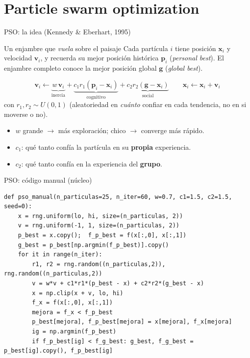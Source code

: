 \documentclass[aspectratio=169,10pt]{beamer}
\newcommand{\x}{\mathbf{x}}
\begin{document}
\section{Particle swarm optimization}

\begin{frame}{PSO: la idea (Kennedy \& Eberhart, 1995)}
  \begin{block}{Un enjambre que \emph{vuela} sobre el paisaje}
    Cada partícula $i$ tiene posición $\x_i$ y velocidad $\mathbf v_i$, y
    recuerda su mejor posición histórica $\mathbf p_i$
    (\emph{personal best}). El enjambre completo conoce la mejor
    posición global $\mathbf g$ (\emph{global best}).
  \end{block}
  \[
    \mathbf v_i \leftarrow \underbrace{w\,\mathbf v_i}_{\text{inercia}}
      + \underbrace{c_1 r_1(\mathbf p_i - \x_i)}_{\text{cognitivo}}
      + \underbrace{c_2 r_2(\mathbf g - \x_i)}_{\text{social}}
    \qquad
    \x_i \leftarrow \x_i + \mathbf v_i
  \]
  con $r_1,r_2\sim U(0,1)$ (aleatoriedad en \emph{cuánto} confiar en cada
  tendencia, no en si moverse o no).
  \begin{itemize}
    \item $w$ grande $\to$ más exploración; chico $\to$ converge más
      rápido.
    \item $c_1$: qué tanto confía la partícula en su \textbf{propia}
      experiencia.
    \item $c_2$: qué tanto confía en la experiencia del \textbf{grupo}.
  \end{itemize}
\end{frame}

\begin{frame}[fragile]{PSO: código manual (núcleo)}
\begin{lstlisting}
def pso_manual(n_particulas=25, n_iter=60, w=0.7, c1=1.5, c2=1.5, seed=0):
    x = rng.uniform(lo, hi, size=(n_particulas, 2))
    v = rng.uniform(-1, 1, size=(n_particulas, 2))
    p_best = x.copy();  f_p_best = f(x[:,0], x[:,1])
    g_best = p_best[np.argmin(f_p_best)].copy()
    for it in range(n_iter):
        r1, r2 = rng.random((n_particulas,2)), rng.random((n_particulas,2))
        v = w*v + c1*r1*(p_best - x) + c2*r2*(g_best - x)
        x = np.clip(x + v, lo, hi)
        f_x = f(x[:,0], x[:,1])
        mejora = f_x < f_p_best
        p_best[mejora], f_p_best[mejora] = x[mejora], f_x[mejora]
        ig = np.argmin(f_p_best)
        if f_p_best[ig] < f_g_best: g_best, f_g_best = p_best[ig].copy(), f_p_best[ig]
\end{lstlisting}
\end{frame}
\end{document}
